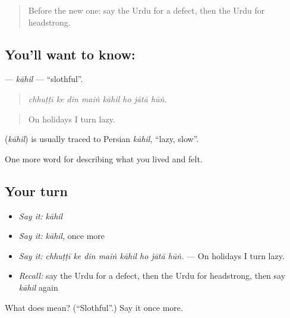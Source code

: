 \label{lesson:UR-C455-kahil}



\begin{quote}
Before the new one: say the Urdu for a defect, then the Urdu for headstrong.
\end{quote}

\subsection*{You'll want to know: }
\textbf{} — \emph{kāhil} — \textquotedblleft{}slothful\textquotedblright{}.

\begin{quote}
       
\end{quote}

\begin{quote}
\emph{chhuṭṭī ke din maiṅ kāhil ho jātā hūṅ.}
\end{quote}

\begin{quote}
On holidays I turn lazy.
\end{quote}

\begin{cousinweb}
\textbf{} (\emph{kāhil}) is usually traced to Persian \emph{kāhil}, \textquotedblleft{}lazy, slow\textquotedblright{}.
\end{cousinweb}

\begin{grammarlens}[title={What you've built}]
One more word for describing what you lived and felt.
\end{grammarlens}

\subsection*{Your turn}
\begin{itemize}
\raggedright
  \item \emph{Say it:} \emph{kāhil}
  \item \emph{Say it:} \emph{kāhil}, once more
  \item \emph{Say it:} \emph{chhuṭṭī ke din maiṅ kāhil ho jātā hūṅ.} — On holidays I turn lazy.
  \item \emph{Recall:} say the Urdu for a defect, then the Urdu for headstrong, then say \emph{kāhil} again
\end{itemize}

\begin{tcolorbox}[breakable,colback=teal!4,colframe=teal!35!black,title={Before you move on}]
What does  mean? (\textquotedblleft{}Slothful\textquotedblright{}.) Say it once more.
\end{tcolorbox}

